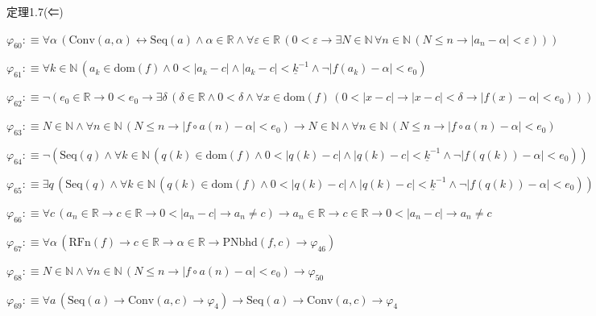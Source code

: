 \begin{fullproof}{定理1.7(⇐)}
\begin{abbrevlist}
\item $\varphi_{60} :\equiv \forall \alpha\,(\mathrm{Conv}(a,\alpha) \leftrightarrow \mathrm{Seq}(a) \land \alpha \in \mathbb{R} \land \forall \varepsilon \in \mathbb{R}\,(0 < \varepsilon \to \exists N \in \mathbb{N}\,\forall n \in \mathbb{N}\,(N \leq n \to \lvert a_{n} - \alpha \rvert < \varepsilon)))$
\item $\varphi_{61} :\equiv \forall k \in \mathbb{N}\,(a_{k} \in \mathrm{dom}(f) \land 0 < \lvert a_{k} - c \rvert \land \lvert a_{k} - c \rvert < \underline{k}^{-1} \land \neg \lvert f(a_{k}) - \alpha \rvert < e_{0})$
\item $\varphi_{62} :\equiv \neg (e_{0} \in \mathbb{R} \to 0 < e_{0} \to \exists \delta\,(\delta \in \mathbb{R} \land 0 < \delta \land \forall x \in \mathrm{dom}(f)\,(0 < \lvert x - c \rvert \to \lvert x - c \rvert < \delta \to \lvert f(x) - \alpha \rvert < e_{0})))$
\item $\varphi_{63} :\equiv N \in \mathbb{N} \land \forall n \in \mathbb{N}\,(N \leq n \to \lvert f \circ a(n) - \alpha \rvert < e_{0}) \to N \in \mathbb{N} \land \forall n \in \mathbb{N}\,(N \leq n \to \lvert f \circ a(n) - \alpha \rvert < e_{0})$
\item $\varphi_{64} :\equiv \neg (\mathrm{Seq}(q) \land \forall k \in \mathbb{N}\,(q(k) \in \mathrm{dom}(f) \land 0 < \lvert q(k) - c \rvert \land \lvert q(k) - c \rvert < \underline{k}^{-1} \land \neg \lvert f(q(k)) - \alpha \rvert < e_{0}))$
\item $\varphi_{65} :\equiv \exists q\,(\mathrm{Seq}(q) \land \forall k \in \mathbb{N}\,(q(k) \in \mathrm{dom}(f) \land 0 < \lvert q(k) - c \rvert \land \lvert q(k) - c \rvert < \underline{k}^{-1} \land \neg \lvert f(q(k)) - \alpha \rvert < e_{0}))$
\item $\varphi_{66} :\equiv \forall c\,(a_{n} \in \mathbb{R} \to c \in \mathbb{R} \to 0 < \lvert a_{n} - c \rvert \to a_{n} \neq c) \to a_{n} \in \mathbb{R} \to c \in \mathbb{R} \to 0 < \lvert a_{n} - c \rvert \to a_{n} \neq c$
\item $\varphi_{67} :\equiv \forall \alpha\,(\mathrm{RFn}(f) \to c \in \mathbb{R} \to \alpha \in \mathbb{R} \to \mathrm{PNbhd}(f,c) \to \varphi_{46})$
\item $\varphi_{68} :\equiv N \in \mathbb{N} \land \forall n \in \mathbb{N}\,(N \leq n \to \lvert f \circ a(n) - \alpha \rvert < e_{0}) \to \varphi_{50}$
\item $\varphi_{69} :\equiv \forall a\,(\mathrm{Seq}(a) \to \mathrm{Conv}(a,c) \to \varphi_{4}) \to \mathrm{Seq}(a) \to \mathrm{Conv}(a,c) \to \varphi_{4}$

\end{abbrevlist}
\end{fullproof}
